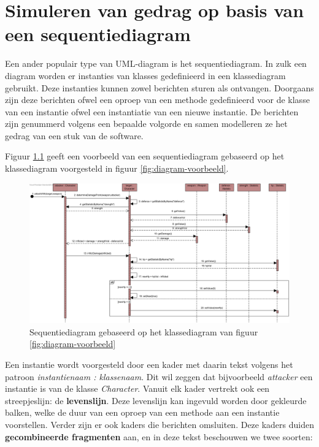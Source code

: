 \chapter{Simuleren van gedrag op basis van een sequentiediagram}\label{sec:gedrag}
Een ander populair type van UML-diagram is het sequentiediagram. In zulk een diagram worden er instanties van klasses gedefinieerd in een klassediagram gebruikt. Deze instanties kunnen zowel berichten sturen als ontvangen. Doorgaans zijn deze berichten ofwel een oproep van een methode gedefinieerd voor de klasse van een instantie ofwel een instantiatie van een nieuwe instantie. De berichten zijn genummerd volgens een bepaalde volgorde en samen modelleren ze het gedrag van een stuk van de software.

\parbreak

Figuur \ref{fig:seq-diagram-game} geeft een voorbeeld van een sequentiediagram gebaseerd op het klassediagram voorgesteld in figuur \ref{fig:diagram-voorbeeld}.

\begin{figure}[H]
	\label{fig:seq-diagram-game}
	\includegraphics[width=\textwidth]{chap-gedrag/seq-diagram-game.png}
	\caption{Sequentiediagram gebaseerd op het klassediagram van figuur \ref{fig:diagram-voorbeeld}}
\end{figure}

Een instantie wordt voorgesteld door een kader met daarin tekst volgens het patroon \textit{instantienaam : klassenaam}. Dit wil zeggen dat bijvoorbeeld \textit{attacker} een instantie is van de klasse \textit{Character}. Vanuit elk kader vertrekt ook een streepjeslijn: de \textbf{levenslijn}. Deze levenslijn kan ingevuld worden door gekleurde balken, welke de duur van een oproep van een methode aan een instantie voorstellen.
Verder zijn er ook kaders die berichten omsluiten. Deze kaders duiden \textbf{gecombineerde fragmenten} aan, en in deze tekst beschouwen we twee soorten:

